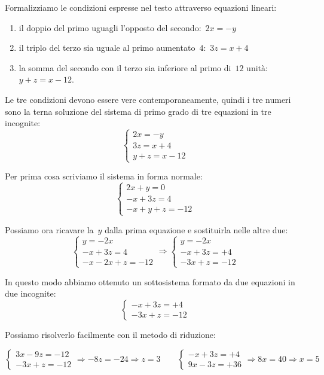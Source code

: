 \begin{soluzione}
Formalizziamo le condizioni espresse nel testo attraverso equazioni
lineari:

\begin{enumerate}[nosep]
\item il doppio del primo uguagli l'opposto del secondo:~$2x=-y$
\item il triplo del terzo sia uguale al primo aumentato~$4$:~$3z=x+4$
\item la somma del secondo con il terzo sia inferiore al primo di~$12$ 
unità:~$y+z=x-12$.
\end{enumerate}

Le tre condizioni devono essere vere contemporaneamente, quindi i tre
numeri sono la terna soluzione del sistema di primo grado di tre equazioni in 
tre incognite:
\[\left\{\begin{array}{l}
  2x=-y\\
  3z=x+4\\
  y+z=x-12
\end{array}\right.\]

Per prima cosa scriviamo il sistema in forma normale:
\[\left\{\begin{array}{l}
  2x+y=0\\
  -x+3z=4\\
  -x+y+z=-12
\end{array}\right.\]

Possiamo ora ricavare la~$y$ dalla prima equazione e sostituirla nelle altre 
due:
\[\left\{\begin{array}{l}
  y=-2x\\
  -x+3z=4\\
  -x -2x+z=-12
\end{array}\right.
\Rightarrow
\left\{\begin{array}{l}
  y=-2x\\
  -x+3z=+4\\
  -3x+z=-12
\end{array}\right.\]

In questo modo abbiamo ottenuto un sottosistema formato da due equazioni in 
due incognite:
\[\left\{\begin{array}{l}
  -x+3z=+4\\
  -3x+z=-12
\end{array}\right.\]

Possiamo risolverlo facilmente con il metodo di riduzione:

\[\left\{\begin{array}{l}
  3x-9z=-12\\
  -3x+z=-12
\end{array}\right.
\Rightarrow -8z=-24 \Rightarrow z=3
\qquad
\left\{\begin{array}{l}
  -x+3z=+4\\
  9x-3z=+36
\end{array}\right.
\Rightarrow 8x=40 \Rightarrow x=5
\]


\end{soluzione}
